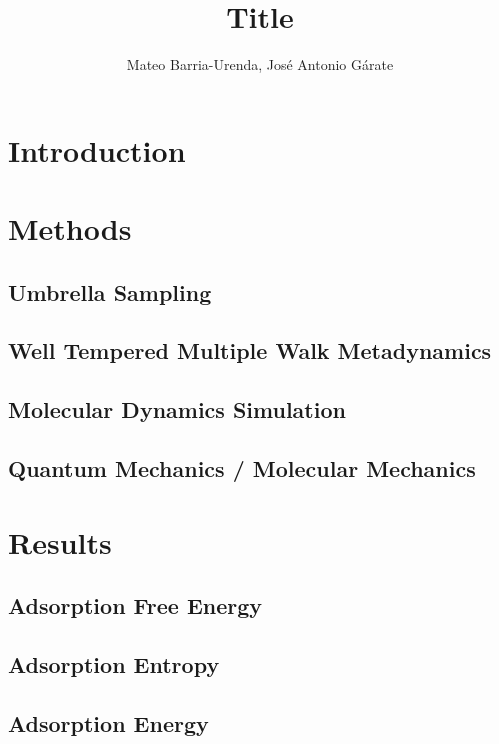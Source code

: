 \documentclass[twoside,twocolumn,9pt]{article}
\author{Mateo Barria-Urenda, José Antonio Gárate}
\title{Title}
\date{}
\begin{document}
\maketitle

\abstract{}

\section{Introduction}

\section{Methods}

\subsection{Umbrella Sampling}

\subsection{Well Tempered Multiple Walk Metadynamics}

\subsection{Molecular Dynamics Simulation}

\subsection{Quantum Mechanics / Molecular Mechanics}

\section{Results}

\subsection{Adsorption Free Energy}

\subsection{Adsorption Entropy}

\subsection{Adsorption Energy}
\end{document}

